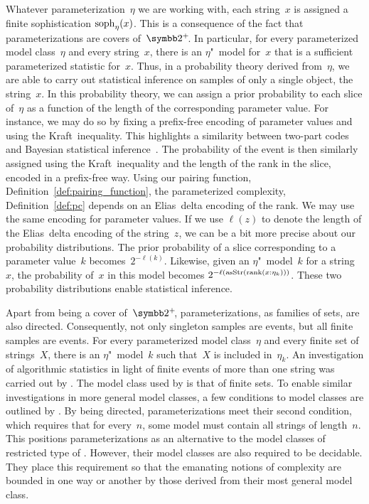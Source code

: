 \label{p:inference}%
Whatever parameterization~$\eta$ we are working with, each string~$x$ is assigned a finite sophistication $\operatorname{soph}_\eta(x)$.
This is a consequence of the fact that parameterizations are covers of~$\binary^+\!$.
In particular, for every parameterized model class~$\eta$ and every string~$x$, there is an $\eta$"~model for~$x$ that is a sufficient parameterized statistic for~$x$.
Thus, in a probability theory derived from~$\eta$, we are able to carry out statistical inference on samples of only a single object, the string~$x$.
In this probability theory, we can assign a prior probability to each slice of~$\eta$ as a function of the length of the corresponding parameter value.
For instance, we may do so by fixing a prefix-free encoding of parameter values and using the Kraft~inequality.
This highlights a similarity between two-part codes and Bayesian statistical inference~\parencite{grunwald2007minimum}.
The probability of the event is then similarly assigned using the Kraft~inequality and the length of the rank in the slice, encoded in a prefix-free way.
Using our pairing function, Definition~\ref{def:pairing_function}, the parameterized complexity, Definition~\ref{def:pc} depends on an Elias~delta encoding of the rank.
We may use the same encoding for parameter values.
If we use $\ell(z)$ to denote the length of the Elias~delta encoding of the string~$z$, we can be a bit more precise about our probability distributions.
The prior probability of a slice corresponding to a parameter value~$k$ becomes~$2^{-\ell(k)}$.
Likewise, given an $\eta$"~model~$k$ for a string~$x$, the probability of~$x$ in this model becomes $2^{-\ell(\operatorname{asStr}(\operatorname{rank}(x : \eta_k)))}$.
These two probability distributions enable statistical inference.

Apart from being a cover of~$\binary^+\!$, parameterizations, as families of sets, are also directed.
Consequently, not only singleton samples are events, but all finite samples are events.
For every parameterized model class~$\eta$ and every finite set of strings~$X$, there is an $\eta$"~model~$k$ such that~$X$ is included in~$\eta_k$.
An investigation of algorithmic statistics in light of finite events of more than one string was carried out by \textcite{milovanov2016algorithmic}.
The model class used by \citeauthor{milovanov2016algorithmic} is that of finite sets.
To enable similar investigations in more general model classes, a few conditions to model classes are outlined by \textcite[Section~6.1]{vereshchagin2017algorithmic}.
By being directed, parameterizations meet their second condition, which requires that for every~$n$, some model must contain all strings of length~$n$.
This positions parameterizations as an alternative to the model classes of restricted type of \textcite{vereshchagin2017algorithmic}.
However, their model classes are also required to be decidable.
They place this requirement so that the emanating notions of complexity are bounded in one way or another by those derived from their most general model class.

